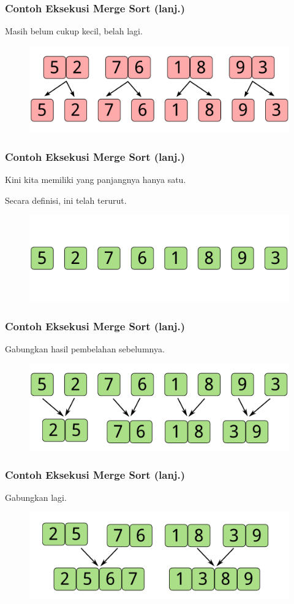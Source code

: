 \begin{frame}
\frametitle{Contoh Eksekusi Merge Sort (lanj.)}
Masih belum cukup kecil, belah lagi.
\begin{figure}
  \centering
  \includegraphics[width=10 cm]{asset/merge-sort-demo-3.pdf}
\end{figure}
\end{frame}

\begin{frame}
\frametitle{Contoh Eksekusi Merge Sort (lanj.)}
Kini kita memiliki \farray yang panjangnya hanya satu.\newline

Secara definisi, \farray ini telah terurut.
\begin{figure}
  \centering
  \includegraphics[width=10 cm]{asset/merge-sort-demo-4.pdf}
\end{figure}
\end{frame}

\begin{frame}
\frametitle{Contoh Eksekusi Merge Sort (lanj.)}
Gabungkan hasil pembelahan sebelumnya.
\begin{figure}
  \centering
  \includegraphics[width=10 cm]{asset/merge-sort-demo-5.pdf}
\end{figure}
\end{frame}

\begin{frame}
\frametitle{Contoh Eksekusi Merge Sort (lanj.)}
Gabungkan lagi.
\begin{figure}
  \centering
  \includegraphics[width=10 cm]{asset/merge-sort-demo-6.pdf}
\end{figure}
\end{frame}

